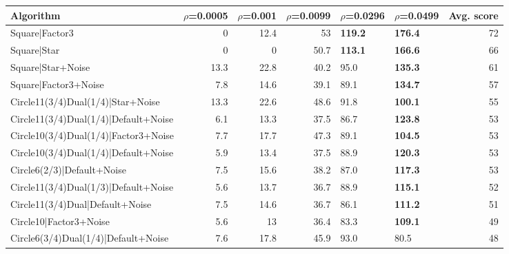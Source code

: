 \begin{tabular}{lrrrllr}
\hline
 Algorithm                            &   $\rho$=0.0005 &   $\rho$=0.001 &   $\rho$=0.0099 & $\rho$=0.0296   & $\rho$=0.0499   &   Avg. score \\
\hline
 Square|Factor3                       &             0   &           12.4 &            53   & \textbf{119.2}  & \textbf{176.4}  &           72 \\
 Square|Star                          &             0   &            0   &            50.7 & \textbf{113.1}  & \textbf{166.6}  &           66 \\
 Square|Star+Noise                    &            13.3 &           22.8 &            40.2 & 95.0            & \textbf{135.3}  &           61 \\
 Square|Factor3+Noise                 &             7.8 &           14.6 &            39.1 & 89.1            & \textbf{134.7}  &           57 \\
 Circle11(3/4)Dual(1/4)|Star+Noise    &            13.3 &           22.6 &            48.6 & 91.8            & \textbf{100.1}  &           55 \\
 Circle11(3/4)Dual(1/4)|Default+Noise &             6.1 &           13.3 &            37.5 & 86.7            & \textbf{123.8}  &           53 \\
 Circle10(3/4)Dual(1/4)|Factor3+Noise &             7.7 &           17.7 &            47.3 & 89.1            & \textbf{104.5}  &           53 \\
 Circle10(3/4)Dual(1/4)|Default+Noise &             5.9 &           13.4 &            37.5 & 88.9            & \textbf{120.3}  &           53 \\
 Circle6(2/3)|Default+Noise           &             7.5 &           15.6 &            38.2 & 87.0            & \textbf{117.3}  &           53 \\
 Circle11(3/4)Dual(1/3)|Default+Noise &             5.6 &           13.7 &            36.7 & 88.9            & \textbf{115.1}  &           52 \\
 Circle11(3/4)Dual|Default+Noise      &             7.5 &           14.6 &            36.7 & 86.1            & \textbf{111.2}  &           51 \\
 Circle10|Factor3+Noise               &             5.6 &           13   &            36.4 & 83.3            & \textbf{109.1}  &           49 \\
 Circle6(3/4)Dual(1/4)|Default+Noise  &             7.6 &           17.8 &            45.9 & 93.0            & 80.5            &           48 \\

\end{tabular}
